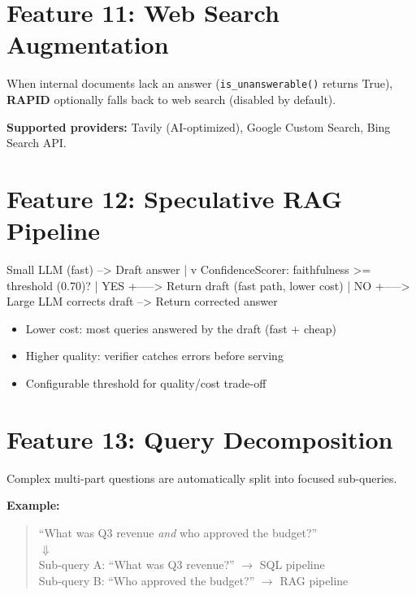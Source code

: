 \documentclass[12pt, a4paper, oneside]{report}
\newcommand{\kw}[1]{\texttt{\small #1}}
\newcommand{\rapidsys}{\textbf{\color{rapidblue}RAPID}}
\begin{document}
\section{Feature 11: Web Search Augmentation}

When internal documents lack an answer (\kw{is\_unanswerable()} returns True), \rapidsys{}
optionally falls back to web search (disabled by default).

\textbf{Supported providers:} Tavily (AI-optimized), Google Custom Search, Bing Search API.

\section{Feature 12: Speculative RAG Pipeline}

\begin{codebox}
Small LLM (fast) --> Draft answer
        |
        v
ConfidenceScorer: faithfulness >= threshold (0.70)?
        |
   YES  +-----> Return draft (fast path, lower cost)
        |
   NO   +-----> Large LLM corrects draft --> Return corrected answer
\end{codebox}

\begin{probox}[Benefits]
\begin{itemize}
  \item Lower cost: most queries answered by the draft (fast + cheap)
  \item Higher quality: verifier catches errors before serving
  \item Configurable threshold for quality/cost trade-off
\end{itemize}
\end{probox}

\section{Feature 13: Query Decomposition}

Complex multi-part questions are automatically split into focused sub-queries.

\textbf{Example:}
\begin{quote}
``What was Q3 revenue \textit{and} who approved the budget?''\\
\(\Downarrow\)\\
Sub-query A: ``What was Q3 revenue?'' \(\to\) SQL pipeline\\
Sub-query B: ``Who approved the budget?'' \(\to\) RAG pipeline
\end{quote}
\end{document}
